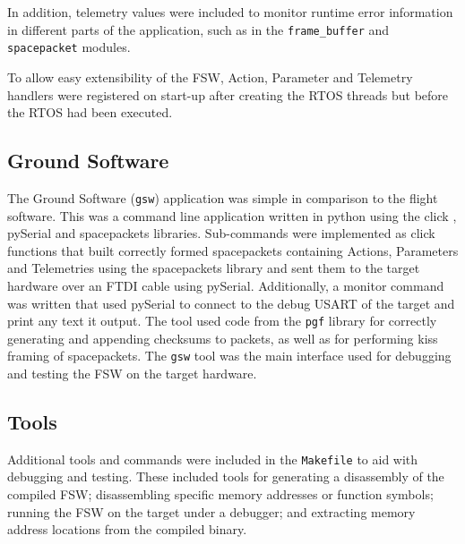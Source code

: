 \documentclass[../report.tex]{subfiles}
\begin{document}
In addition, telemetry values were included to monitor runtime error
information in different parts of the application, such as in the
\lstinline|frame_buffer| and \lstinline|spacepacket| modules.

To allow easy extensibility of the FSW, Action, Parameter and Telemetry
handlers were registered on start-up after creating the RTOS threads but before
the RTOS had been executed.

\subsection{Ground Software}

The Ground Software (\lstinline|gsw|) application was simple in comparison to
the flight software. This was a command line application written in python
using the click \citep{click}, pySerial \citep{pyserial} and spacepackets
\citep{spacepackets} libraries. Sub-commands were implemented as click
functions that built correctly formed spacepackets containing Actions,
Parameters and Telemetries using the spacepackets library and sent them to the
target hardware over an FTDI cable using pySerial. Additionally, a monitor
command was written that used pySerial to connect to the debug USART of the
target and print any text it output. The tool used code from  the
\lstinline|pgf| library for correctly generating and appending checksums to
packets, as well as for performing kiss framing of spacepackets. The
\lstinline|gsw| tool was the main interface used for debugging and testing the
FSW on the target hardware.

\subsection{Tools} \label{sec:fsw-tools}

Additional tools and commands were included in the \lstinline|Makefile| to aid
with debugging and testing. These included tools for generating a disassembly
of the compiled FSW; disassembling specific memory addresses or function
symbols; running the FSW on the target under a debugger; and extracting memory
address locations from the compiled binary.



\end{document}

